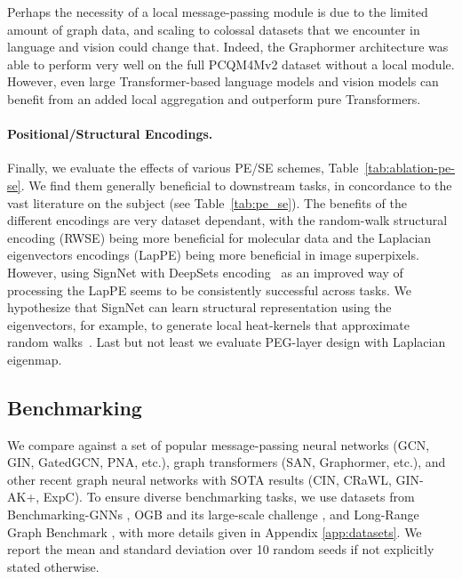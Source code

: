 \documentclass{article}
\begin{document}
Perhaps the necessity of a local message-passing module is due to the limited amount of graph data, and scaling to colossal datasets \cite{raffel2020t5} that we encounter in language and vision could change that. Indeed, the Graphormer architecture \cite{ying2021graphormer} was able to perform very well on the full PCQM4Mv2 dataset without a local module. However, even large Transformer-based language models \cite{chelombiev2021groupbert} and vision models \cite{han2022survey_vision_transformer} can benefit from an added local aggregation and outperform pure Transformers.


\paragraph{Positional/Structural Encodings.}
Finally, we evaluate the effects of various PE/SE schemes, Table~\ref{tab:ablation-pe-se}. We find them generally beneficial to downstream tasks, in concordance to the vast literature on the subject (see Table~\ref{tab:pe_se}). The benefits of the different encodings are very dataset dependant, with the random-walk structural encoding (RWSE) being more beneficial for molecular data and the Laplacian eigenvectors encodings (LapPE) being more beneficial in image superpixels. However, using SignNet with DeepSets encoding~\cite{lim2022sign} as an improved way of processing the LapPE seems to be consistently successful across tasks. We hypothesize that SignNet can learn structural representation using the eigenvectors, for example, to generate local heat-kernels that approximate random walks~\cite{andres2016heat}. Last but not least we evaluate PEG-layer design \cite{wang2022equivstable} with Laplacian eigenmap. 




\subsection{Benchmarking \method}\label{sec:benchmarking}
We compare \method against a set of popular message-passing neural networks (GCN, GIN, GatedGCN, PNA, etc.), graph transformers (SAN, Graphormer, etc.), and other recent graph neural networks with SOTA results (CIN, CRaWL, GIN-AK+, ExpC). To ensure diverse benchmarking tasks, we use datasets from Benchmarking-GNNs \cite{dwivedi2020benchmarking}, OGB \cite{hu2020ogb} and its large-scale challenge \cite{hu2021ogblsc}, and Long-Range Graph Benchmark \cite{dwivedi2022LRGB}, with more details given in Appendix \ref{app:datasets}. We report the mean and standard deviation over 10 random seeds if not explicitly stated otherwise.
\end{document}
